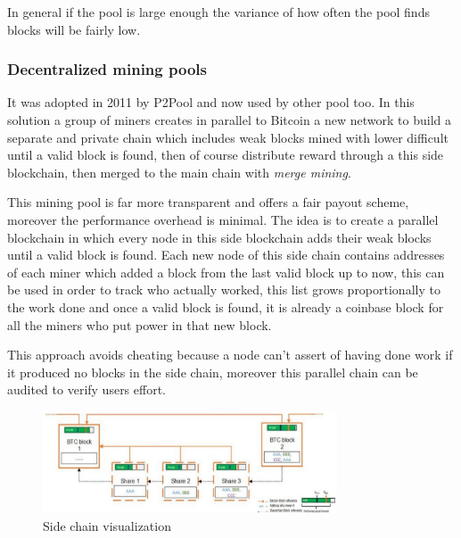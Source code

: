 In general if the pool is large enough the variance of how often the pool finds blocks will be fairly low.

\subsubsection{Decentralized mining pools}
It was adopted in 2011 by P2Pool and now used by other pool too.
In this solution a group of miners creates in parallel to Bitcoin a new network to build a separate and private chain which includes weak blocks mined with lower difficult until a valid block is found, then of course distribute reward through a this side blockchain, then merged to the main chain with \emph{merge mining}.

This mining pool is far more transparent and offers a fair payout scheme, moreover the performance overhead is minimal.
The idea is to create a parallel blockchain in which every node in this side blockchain adds their weak blocks until a valid block is found.
Each new node of this side chain contains addresses of each miner which added a block from the last valid block up to now, this can be used in order to track who actually worked, this list grows proportionally to the work done and once a valid block is found, it is already a coinbase block for all the miners who put power in that new block.

This approach avoids cheating because a node can't assert of having done work if it produced no blocks in the side chain, moreover this parallel chain can be audited to verify users effort.

\begin{figure}[H]
    \centering
    \includegraphics[width=330px]{images/6_Bitcoin/05.png}
    \caption{Side chain visualization}
\end{figure}





